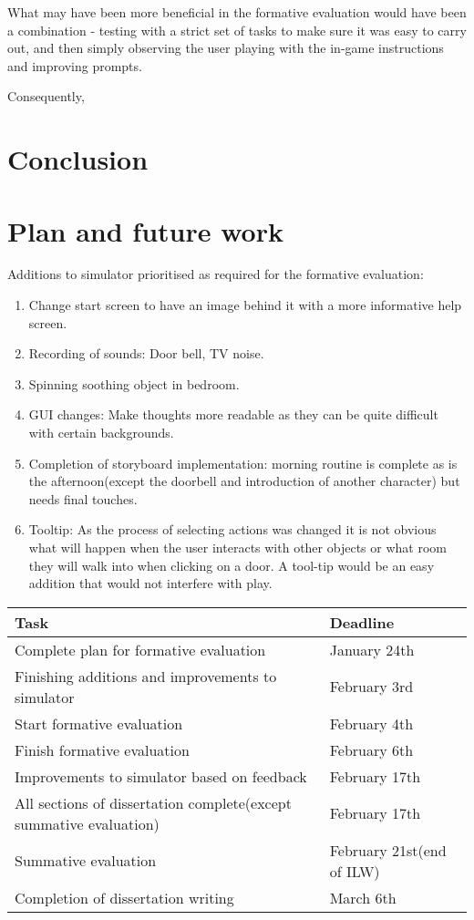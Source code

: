 \documentclass[11pt]{report}
\begin{document}
What may have been more beneficial in the formative evaluation would have been a combination - testing with a strict set of tasks to make sure it was easy to carry out, and then simply observing the user playing with the in-game instructions and improving prompts.

Consequently, 

\chapter{Conclusion}

\chapter{Plan and future work}

Additions to simulator prioritised as required for the formative evaluation:

\begin{enumerate}
\item Change start screen to have an image behind it with a more informative help screen.
\item Recording of sounds: Door bell, TV noise.
\item Spinning soothing object in bedroom.
\item GUI changes: Make thoughts more readable as they can be quite difficult with certain backgrounds.
\item Completion of storyboard implementation: morning routine is complete as is the afternoon(except the doorbell and introduction of another character) but needs final touches.
\item Tooltip: As the process of selecting actions was changed it is not obvious what will happen when the user interacts with other objects or what room they will walk into when clicking on a door. A tool-tip would be an easy addition that would not interfere with play.
\end{enumerate}

\begin{table}[H]
\begin{tabular}{| p{8cm} | p{4cm} | }
\hline
Task & Deadline \\
\hline
Complete plan for formative evaluation & January 24th \\
\hline
Finishing additions and improvements to simulator & February 3rd \\
\hline
Start formative evaluation & February 4th \\
\hline
Finish formative evaluation & February 6th \\
\hline
Improvements to simulator based on feedback & February 17th \\
\hline
All sections of dissertation complete(except summative evaluation) & February 17th \\
\hline
Summative evaluation & February 21st(end of ILW) \\
\hline
Completion of dissertation writing & March 6th \\
\hline
\end{tabular}
\end{table}
\end{document}
